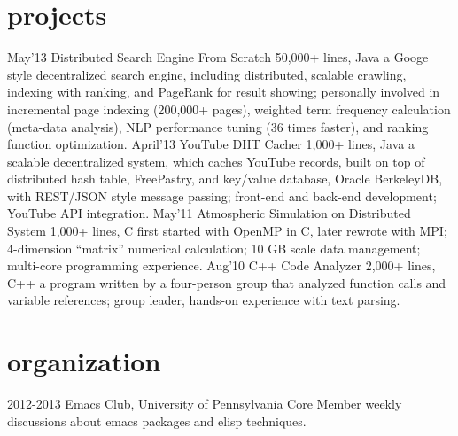 \documentclass[]{friggeri-cv}
\begin{document}
\section{projects}
\begin{entrylist}
  \entry
  {May'13}
  {Distributed Search Engine From Scratch}
  {50,000+ lines, Java}
  {a Googe style decentralized search engine, including distributed, scalable crawling, indexing with ranking, and PageRank for result showing; personally involved in incremental page indexing (200,000+ pages), weighted term frequency calculation (meta-data analysis), NLP performance tuning (36 times faster), and ranking function optimization.}
  \entry
  {April'13}
  {YouTube DHT Cacher}
  {1,000+ lines, Java}
  {a scalable decentralized system, which caches YouTube records, built on top of distributed hash table, FreePastry, and key/value database, Oracle BerkeleyDB, with REST/JSON style message passing; front-end and back-end development; YouTube API integration.}
  \entry
  {May'11}
  {Atmospheric Simulation on Distributed System}
  {1,000+ lines, C}
  {first started with OpenMP in C, later rewrote with MPI; 4-dimension “matrix” numerical calculation; 10 GB scale data management; multi-core programming experience.}
  \entry
  {Aug'10}
  {C++ Code Analyzer}
  {2,000+ lines, C++}
  {a program written by a four-person group that analyzed function calls and variable references; group leader, hands-on experience with text parsing.}
\end{entrylist}
\section{organization}
\begin{entrylist}
  \entry
  {2012-2013}
  {Emacs Club, University of Pennsylvania}
  {Core Member}
  {weekly discussions about emacs packages and elisp techniques.}
\end{entrylist}
\end{document}
